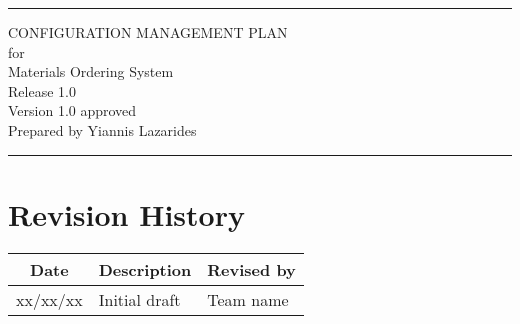 \documentclass[letterpaper,12pt,oneside,listof=totoc]{scrreprt}
\date{\today}
\author{} %
\def\myversion{1.0 }
\begin{document}
\begin{titlepage}
\flushright
\rule{\textwidth}{5pt}\vskip1cm
\Huge{CONFIGURATION MANAGEMENT PLAN}\\
\vspace{1.5cm}
for\\
\vspace{1.5cm}
Materials Ordering System\\
\vspace{1.5cm}
\LARGE{Release 1.0\\}
\vspace{1.5cm}
\LARGE{Version \myversion approved\\}
\vspace{1.5cm}
Prepared by Yiannis Lazarides\\
\vfill
\rule{\textwidth}{5pt}
\end{titlepage}

\tableofcontents

\listoffigures

\listoftables

\chapter*{Revision History}

\begin{tabular}{| c | p{} | p{} |}
\hline
Date     & Description   & Revised by \\
\hline
xx/xx/xx & Initial draft & Team name \\
\hline
\end{tabular}

%
% 
% 
% 
\end{document}
